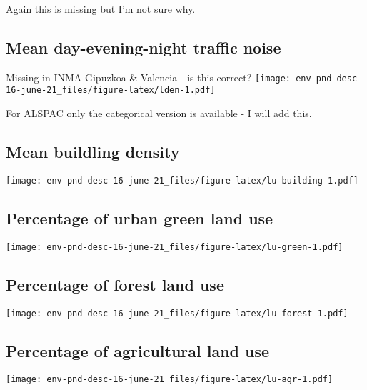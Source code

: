 \documentclass[]{article}
\begin{document}
Again this is missing but I'm not sure why.

\hypertarget{mean-day-evening-night-traffic-noise}{%
\subsection{Mean day-evening-night traffic noise}\label{mean-day-evening-night-traffic-noise}}

Missing in INMA Gipuzkoa \& Valencia - is this correct?
\texttt{[image: env-pnd-desc-16-june-21\_files/figure-latex/lden-1.pdf]}

For ALSPAC only the categorical version is available - I will add this.

\newpage

\hypertarget{mean-buildling-density}{%
\subsection{Mean buildling density}\label{mean-buildling-density}}

\texttt{[image: env-pnd-desc-16-june-21\_files/figure-latex/lu-building-1.pdf]}

\newpage

\hypertarget{percentage-of-urban-green-land-use}{%
\subsection{Percentage of urban green land use}\label{percentage-of-urban-green-land-use}}

\texttt{[image: env-pnd-desc-16-june-21\_files/figure-latex/lu-green-1.pdf]}

\newpage

\hypertarget{percentage-of-forest-land-use}{%
\subsection{Percentage of forest land use}\label{percentage-of-forest-land-use}}

\texttt{[image: env-pnd-desc-16-june-21\_files/figure-latex/lu-forest-1.pdf]}

\newpage

\hypertarget{percentage-of-agricultural-land-use}{%
\subsection{Percentage of agricultural land use}\label{percentage-of-agricultural-land-use}}

\texttt{[image: env-pnd-desc-16-june-21\_files/figure-latex/lu-agr-1.pdf]}
\end{document}
